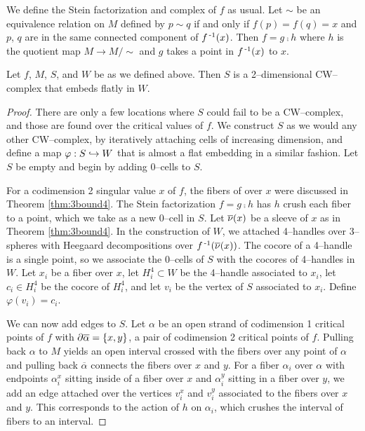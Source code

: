 We define the Stein factorization and complex of $f$ as usual.
Let $\sim$ be an equivalence relation on $M$ defined by $p\sim q$ if and only if $f(p)=f(q)=x$ and $p$, $q$ are in the same connected component of $f^{\,\text{-}1}(x)$.
Then $f=g\comp h$ where $h$ is the quotient map $M\to M/\!\!\sim$ and $g$ takes a point in $f^{\,\text{-}1}(x)$ to $x$.

\begin{theorem}
	\label{thm:stein2complex}
	Let $f$, $M$, $S$, and $W$ be as we defined above.
	Then $S$ is a 2--dimensional CW--complex that embeds flatly in $W$.
\end{theorem}

\begin{proof}
	There are only a few locations where $S$ could fail to be a CW--complex, and those are found over the critical values of $f$.
	We construct $S$ as we would any other CW--complex, by iteratively attaching cells of increasing dimension, and define a map $\varphi:S\hookrightarrow W$ that is almost a flat embedding in a similar fashion.
	Let $S$ be empty and begin by adding 0--cells to $S$.
	
	For a codimension 2 singular value $x$ of $f$, the fibers of over $x$ were discussed in Theorem \ref{thm:3bound4}.
	The Stein factorization $f=g\comp h$ has $h$ crush each fiber to a point, which we take as a new 0--cell in $S$.
	Let $\overline{\nu}(x)$ be a sleeve of $x$ as in Theorem \ref{thm:3bound4}.
	In the construction of $W$, we attached 4--handles over 3--spheres with Heegaard decompositions over $f^{\,\text{-}1}(\overline{\nu}(x))$.
	The cocore of a 4--handle is a single point, so we associate the 0--cells of $S$ with the cocores of 4--handles in $W$.
	Let $x_i$ be a fiber over $x$, let $H_i^4\subset W$ be the 4--handle associated to $x_i$, let $c_i\in H_i^4$ be the cocore of $H_i^4$, and let $v_i$ be the vertex of $S$ associated to $x_i$.
	Define $\varphi(v_i)=c_i$.
	
	We can now add edges to $S$.
	Let $\alpha$ be an open strand of codimension 1 critical points of $f$ with $\partial\overline\alpha=\{x,y\}$, a pair of codimension 2 critical points of $f$.
	Pulling back $\alpha$ to $M$ yields an open interval crossed with the fibers over any point of $\alpha$ and pulling back $\overline\alpha$ connects the fibers over $x$ and $y$.
	For a fiber $\alpha_i$ over $\alpha$ with endpoints $\alpha_i^x$ sitting inside of a fiber over $x$ and $\alpha_i^y$ sitting in a fiber over $y$, we add an edge attached over the vertices $v_i^x$ and $v_i^y$ associated to the fibers over $x$ and $y$.
	This corresponds to the action of $h$ on $\alpha_i$, which crushes the interval of fibers to an interval.
	

\end{proof}
